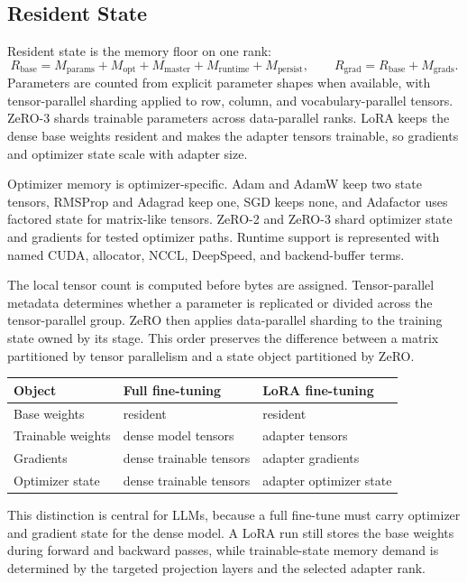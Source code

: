 \subsection{Resident State}
Resident state is the memory floor on one rank:
\[
R_{\mathrm{base}} =
M_{\mathrm{params}} + M_{\mathrm{opt}} + M_{\mathrm{master}}
+ M_{\mathrm{runtime}} + M_{\mathrm{persist}},
\qquad
R_{\mathrm{grad}} = R_{\mathrm{base}} + M_{\mathrm{grads}}.
\]
Parameters are counted from explicit parameter shapes when available, with
tensor-parallel sharding applied to row, column, and vocabulary-parallel
tensors. ZeRO-3 shards trainable parameters across data-parallel ranks. LoRA
keeps the dense base weights resident and makes the adapter tensors trainable,
so gradients and optimizer state scale with adapter size.

Optimizer memory is optimizer-specific. Adam and AdamW keep two state tensors,
RMSProp and Adagrad keep one, SGD keeps none, and Adafactor uses factored state
for matrix-like tensors. ZeRO-2 and ZeRO-3 shard optimizer state and gradients
for tested optimizer paths. Runtime support is represented with named CUDA,
allocator, NCCL, DeepSpeed, and backend-buffer terms.

The local tensor count is computed before bytes are assigned. Tensor-parallel
metadata determines whether a parameter is replicated or divided across the
tensor-parallel group. ZeRO then applies data-parallel sharding to the training
state owned by its stage. This order preserves the difference between a matrix
partitioned by tensor parallelism and a state object partitioned by ZeRO.

\begin{center}
\small
\begin{tabular}{@{}lll@{}}
\toprule
Object & Full fine-tuning & LoRA fine-tuning \\
\midrule
Base weights & resident & resident \\
Trainable weights & dense model tensors & adapter tensors \\
Gradients & dense trainable tensors & adapter gradients \\
Optimizer state & dense trainable tensors & adapter optimizer state \\
\bottomrule
\end{tabular}
\normalsize
\end{center}

This distinction is central for LLMs, because a full fine-tune must carry
optimizer and gradient state for the dense model. A LoRA run still stores the
base weights during forward and backward passes, while trainable-state memory demand is determined by
the targeted projection layers and the selected adapter rank.

